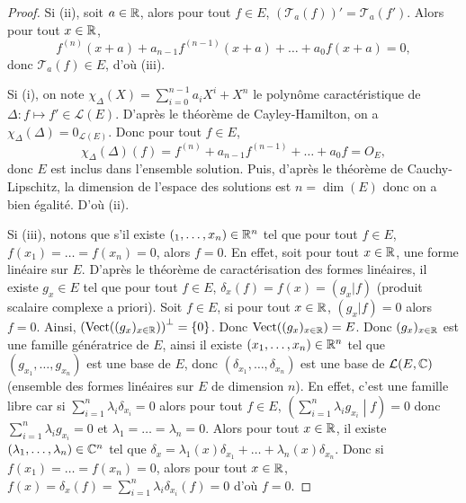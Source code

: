 \documentclass[12pt]{article}
\begin{document}
\begin{proof}
	Si (ii), soit $a\in\mathbb{R}$, alors pour tout $f\in E$, $(\mathcal{T}_a(f))'=\mathcal{T}_a(f')$. Alors pour tout $x\in\mathbb{R}$,
	\begin{equation*}
		f^{(n)}(x+a)+a_{n-1}f^{(n-1)}(x+a)+\dots+a_{0}f(x+a)=0,
	\end{equation*}
	donc $\mathcal{T}_{a}(f)\in E$, d'où (iii).

	Si (i), on note $\chi_{\Delta}(X)=\sum_{i=0}^{n-1}a_{i}X^{i}+X^{n}$ le polynôme caractéristique de $\Delta\colon f\mapsto f'\in\mathcal{L}(E)$. D'après le théorème de Cayley-Hamilton, on a $\chi_{\Delta}(\Delta)=0_{\mathcal{L}(E)}$. Donc pour tout $f\in E$, 
	\begin{equation*}
		\chi_{\Delta}(\Delta)(f)=f^{(n)}+a_{n-1}f^{(n-1)}+\dots+a_{0}f=O_{E},
	\end{equation*}
	donc $E$ est inclus dans l'ensemble solution. Puis, d'après le théorème de Cauchy-Lipschitz, la dimension de l'espace des solutions est $n=\dim(E)$ donc on a bien égalité. D'où (ii).

	Si (iii), notons que s'il existe $(_1,\dots,x_n)\in\mathbb{R}^{n}$ tel que pour tout $f\in E$, $f(x_1)=\dots=f(x_n)=0$, alors $f=0$. En effet, soit pour tout $x\in\mathbb{R}$,  une forme linéaire sur $E$.
	D'après le théorème de caractérisation des formes linéaires, il existe $g_x\in E$ tel que pour tout $f\in E$, $\delta_x(f)=f(x)=(g_x|f)$ (produit scalaire complexe a priori). Soit $f\in E$, si pour tout $x\in\mathbb{R}$, $(g_x|f)=0$ alors $f=0$. Ainsi, $\left(\operatorname{Vect}((g_x)_{x\in\mathbb{R}})\right)^{\perp}=\left\lbrace0\right\rbrace$. Donc $\operatorname{Vect}((g_x)_{x\in\mathbb{R}})=E$. Donc $(g_x)_{x\in\mathbb{R}}$ est une famille génératrice de $E$, ainsi il existe $(x_1,\dots,x_n)\in\mathbb{R}^{n}$ tel que $(g_{x_1},\dots,g_{x_n})$ est une base de $E$, donc $(\delta_{x_1},\dots,\delta_{x_n})$ est une base de $\mathcal{L}(E,\mathbb{C})$ (ensemble des formes linéaires sur $E$ de dimension $n$). En effet, c'est une famille libre car si $\sum_{i=1}^{n}\lambda_i \delta_{x_i}=0$ alors pour tout $f\in E$, $\left(\sum_{i=1}^{n}\lambda_i g_{x_i}\middle| f\right)=0$ donc $\sum_{i=1}^{n}\lambda_i g_{x_i}=0$ et $\lambda_1=\dots=\lambda_n=0$.
	Alors pour tout $x\in\mathbb{R}$, il existe $(\lambda_1,\dots,\lambda_n)\in\mathbb{C}^{n}$ tel que $\delta_x=\lambda_1(x)\delta_{x_1}+\dots+\lambda_n(x)\delta_{x_n}$. Donc si $f(x_1)=\dots=f(x_n)=0$, alors pour tout $x\in\mathbb{R}$, $f(x)=\delta_x(f)=\sum_{i=1}^{n}\lambda_i\delta_{x_i}(f)=0$ d'où $f=0$.


\end{proof}
\end{document}
